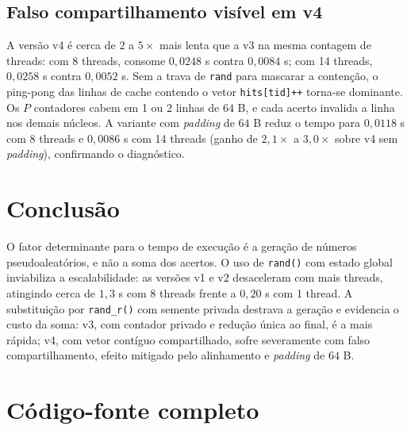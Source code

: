 \documentclass[11pt,letterpaper]{article}
\begin{document}
\subsection{Falso compartilhamento visível em v4}

A versão v4 é cerca de $2$ a $5\times$ mais lenta que a v3 na mesma contagem de threads: com 8 threads, consome $0{,}0248$ s contra $0{,}0084$ s; com 14 threads, $0{,}0258$ s contra $0{,}0052$ s. Sem a trava de \texttt{rand} para mascarar a contenção, o ping-pong das linhas de cache contendo o vetor \texttt{hits[tid]++} torna-se dominante. Os $P$ contadores cabem em 1 ou 2 linhas de $64$ B, e cada acerto invalida a linha nos demais núcleos. A variante com \textit{padding} de $64$ B reduz o tempo para $0{,}0118$ s com 8 threads e $0{,}0086$ s com 14 threads (ganho de $2{,}1\times$ a $3{,}0\times$ sobre v4 sem \textit{padding}), confirmando o diagnóstico.

\section{Conclusão}

O fator determinante para o tempo de execução é a geração de números pseudoaleatórios, e não a soma dos acertos. O uso de \texttt{rand()} com estado global inviabiliza a escalabilidade: as versões v1 e v2 desaceleram com mais threads, atingindo cerca de $1{,}3$ s com 8 threads frente a $0{,}20$ s com 1 thread. A substituição por \texttt{rand\_r()} com semente privada destrava a geração e evidencia o custo da soma: v3, com contador privado e redução única ao final, é a mais rápida; v4, com vetor contíguo compartilhado, sofre severamente com falso compartilhamento, efeito mitigado pelo alinhamento e \textit{padding} de $64$ B.

\appendix

\newpage
\section{Código-fonte completo}
\label{apendice:codigos}










\end{document}
